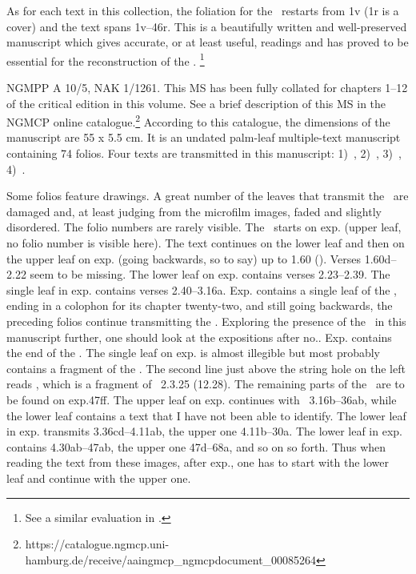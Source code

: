 As for each text in this collection, the foliation for the
\VSS\ restarts from \fol1v (\fol1r is a cover) and the text
spans \fols1v--46r. This is a beautifully written and well-preserved
manuscript which gives accurate, or at least useful, readings and has proved to be
essential for the reconstruction of the \VSS.%
	\footnote{See a similar evaluation in
					.}


NGMPP A 10/5, NAK 1/1261. This MS has been fully collated 
for chapters 1--12 of the critical edition in this volume. 
See a brief description of this MS in
the NGMCP online catalogue.\footnote{https://catalogue.ngmcp.uni-hamburg.de/receive/aaingmcp\_ngmcpdocument\_00085264}
According to this catalogue, the dimensions of the manuscript are 55 x
5.5 cm. It is an undated palm-leaf multiple-text manuscript containing 74
folios. Four texts are transmitted in this manuscript: 
1)~\SDhU,
2)~\Ums,
3)~\SivaUp,
4)~\Vss.

Some folios feature drawings. 
A great number of the leaves that 
transmit the \VSS\ are damaged and, 
at least judging from the microfilm images, 
faded and slightly disordered. The folio numbers are
rarely visible. The \VSS\ starts on exp. 
(upper leaf, no folio number is visible here). 
The text continues on the lower leaf and then on the upper
leaf on exp. (going backwards, so to say) 
up to 1.60 (). 
Verses 1.60d--2.22 seem to be missing. The lower leaf on
exp. contains verses 2.23--2.39. 
The single leaf in exp. contains
verses 2.40--3.16a. Exp. contains a single leaf of the
, ending in a colophon for its chapter
twenty-two, and still going backwards, the preceding folios continue
transmitting the 
\Ums. 
Exploring the presence of
the \VSS\ in this manuscript further, 
one should look at the expositions
after no.. Exp. contains the end of the
\SivaUp. The
single leaf on exp. 
is almost illegible but most probably contains a fragment of the \GautDhS. 
The second line just above the string hole on the left reads  , which is a fragment of \GautDhS\ 2.3.25 (12.28). 
The remaining parts of the \VSS\ are to be found on exp.\thinspace47ff. 
The upper leaf on exp. continues with
\VSS\ 3.16b--36ab, while the lower leaf contains a text that I have not
been able to identify. The lower leaf in exp. transmits
3.36cd--4.11ab, the upper one 4.11b--30a. The lower leaf in 
exp. contains 4.30ab--47ab, 
the upper one 47d--68a, and so on so forth. Thus
when reading the text from these images, after exp., 
one has to start with the lower leaf and continue with the upper one.


